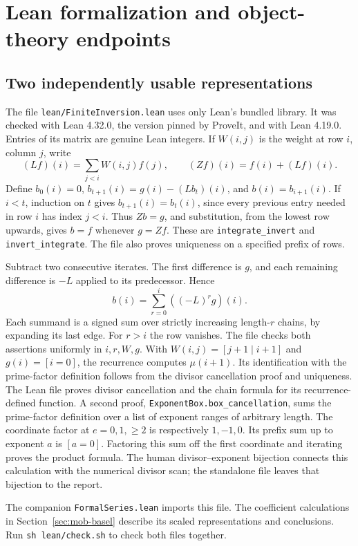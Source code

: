 \section{Lean formalization and object-theory endpoints}
\label{sec:lean-route}

\subsection{Two independently usable representations}
The file \texttt{lean/FiniteInversion.lean} uses only Lean's bundled
library. It was checked with Lean 4.32.0, the version pinned by ProveIt,
and with Lean 4.19.0. Entries of its matrix are genuine Lean integers.
If $W(i,j)$ is the weight at row $i$, column $j$, write
\[
 (Lf)(i)=\sum_{j<i}W(i,j)f(j),\qquad (Zf)(i)=f(i)+(Lf)(i).
\]
Define $b_0(i)=0$, $b_{t+1}(i)=g(i)-(Lb_t)(i)$, and $b(i)=b_{i+1}(i)$.
If $i<t$, induction on $t$ gives $b_{t+1}(i)=b_t(i)$, since every
previous entry needed in row $i$ has index $j<i$. Thus $Zb=g$, and
substitution, from the lowest row upwards, gives $b=f$ whenever $g=Zf$.
These are \texttt{integrate\_invert} and \texttt{invert\_integrate}.
The file also proves uniqueness on a specified prefix of rows.

Subtract two consecutive iterates. The first difference is $g$, and
each remaining difference is $-L$ applied to its predecessor. Hence
\[
 b(i)=\sum_{r=0}^{i} ((-L)^r g)(i).
\]
Each summand is a signed sum over strictly increasing length-$r$ chains,
by expanding its last edge. For $r>i$ the row vanishes.
The file checks both assertions uniformly in $i,r,W,g$.
With $W(i,j)=[j+1\mid i+1]$ and $g(i)=[i=0]$, the recurrence computes
$\mu(i+1)$. Its identification with the prime-factor definition follows
from the divisor cancellation proof and uniqueness. The Lean file proves
divisor cancellation and the chain formula for its recurrence-defined
function. A second proof, \texttt{ExponentBox.box\_cancellation}, sums the
prime-factor definition over a list of exponent ranges of arbitrary
length. The coordinate factor at $e=0,1,\ge2$ is respectively $1,-1,0$.
Its prefix sum up to exponent $a$ is $[a=0]$. Factoring this sum off
the first coordinate and iterating proves the product formula. The human
divisor--exponent bijection connects this calculation with the numerical
divisor scan; the standalone file leaves that bijection to the report.

The companion \texttt{FormalSeries.lean} imports this file. The coefficient
calculations in Section~\ref{sec:mob-basel} describe its scaled
representations and conclusions. Run \texttt{sh lean/check.sh} to check
both files together.


